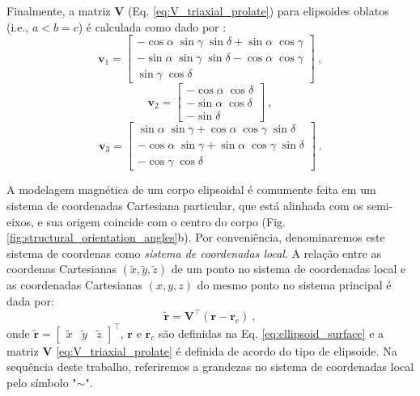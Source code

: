 Finalmente, a matriz $\mathbf{V}$ (Eq. \ref{eq:V_triaxial_prolate}) para elipsoides oblatos (i.e., $a < b = c$) é calculada como dado por \citep{emerson1985}:
\begin{equation}
\mathbf{v}_{1} = \left[\begin{array}{c} 
-\cos\alpha \; \sin\gamma \; \sin\delta + \sin\alpha \; \cos\gamma \\               
-\sin\alpha \; \sin\gamma \; \sin\delta - \cos\alpha \; \cos\gamma \\ 
\sin\gamma \; \cos\delta
\end{array} \right] \: ,
\label{eq:v1_oblate}
\end{equation}
\begin{equation}
\mathbf{v}_{2} = \left[\begin{array}{c} 
-\cos\alpha \; \cos\delta \\
-\sin\alpha \; \cos\delta \\
-\sin\delta
\end{array} \right] \: ,
\label{eq:v2_oblate}
\end{equation}                   
\begin{equation}                    
\mathbf{v}_{3} = \left[\begin{array}{c} 
\sin\alpha \; \sin\gamma + \cos\alpha \; \cos\gamma \; \sin\delta \\                    
-\cos\alpha \; \sin\gamma + \sin\alpha \; \cos\gamma \; \sin\delta \\
-\cos\gamma \; \cos\delta
\end{array} \right] \: .
\label{eq:v3_oblate}
\end{equation}

A modelagem magnética de um corpo elipsoidal é comumente feita em um sistema de coordenadas Cartesiana particular, que está alinhada com os semi-eixos, e sua origem coincide com o centro do corpo (Fig. \ref{fig:structural_orientation_angles}b). Por conveniência, denominaremos este sistema de coordenas como \textit{sistema de coordenadas local}.
A relação entre as coordenas Cartesianas $(\tilde{x}, \tilde{y}, \tilde{z})$
de um ponto no sistema de coordenadas local e as coordenadas Cartesianas $(x, y, z)$ do mesmo ponto no sistema principal é dada por:
\begin{equation}
\tilde{\mathbf{r}} = \mathbf{V}^{\top} \left( \mathbf{r} - \mathbf{r}_{c} \right) \: ,
\label{eq:coord_transformation}
\end{equation}
onde 
$\tilde{\mathbf{r}} = [\begin{array}{ccc} \tilde{x} & 
\tilde{y} & 
\tilde{z} \end{array} ]^{\top}$,
$\mathbf{r}$ e $\mathbf{r}_{c}$
são definidas na Eq. \ref{eq:ellipsoid_surface} e a matriz $\mathbf{V}$ \ref{eq:V_triaxial_prolate}
é definida de acordo do tipo de elipsoide. Na sequência deste trabalho, referiremos a grandezas no sistema de coordenadas local pelo símbolo "$\sim$".

